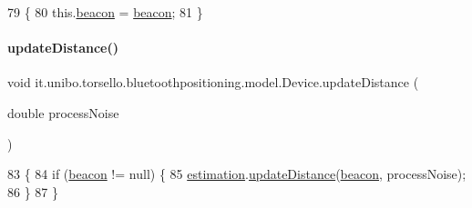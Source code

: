 \begin{DoxyCode}
79                                          \{
80         this.\hyperlink{classit_1_1unibo_1_1torsello_1_1bluetoothpositioning_1_1model_1_1Device_ad5ffce680eb2eb38fc6bb8aee234f155_ad5ffce680eb2eb38fc6bb8aee234f155}{beacon} = \hyperlink{classit_1_1unibo_1_1torsello_1_1bluetoothpositioning_1_1model_1_1Device_ad5ffce680eb2eb38fc6bb8aee234f155_ad5ffce680eb2eb38fc6bb8aee234f155}{beacon};
81     \}
\end{DoxyCode}
\hypertarget{classit_1_1unibo_1_1torsello_1_1bluetoothpositioning_1_1model_1_1Device_af6e2efc8c50b88d07cc651db1f4bbb34_af6e2efc8c50b88d07cc651db1f4bbb34}{}\label{classit_1_1unibo_1_1torsello_1_1bluetoothpositioning_1_1model_1_1Device_af6e2efc8c50b88d07cc651db1f4bbb34_af6e2efc8c50b88d07cc651db1f4bbb34} 
\paragraph{\texorpdfstring{update\+Distance()}{updateDistance()}}
{\footnotesize\ttfamily void it.\+unibo.\+torsello.\+bluetoothpositioning.\+model.\+Device.\+update\+Distance (\begin{DoxyParamCaption}\item[{double}]{process\+Noise }\end{DoxyParamCaption})}


\begin{DoxyCode}
83                                                     \{
84         \textcolor{keywordflow}{if} (\hyperlink{classit_1_1unibo_1_1torsello_1_1bluetoothpositioning_1_1model_1_1Device_ad5ffce680eb2eb38fc6bb8aee234f155_ad5ffce680eb2eb38fc6bb8aee234f155}{beacon} != null) \{
85             \hyperlink{classit_1_1unibo_1_1torsello_1_1bluetoothpositioning_1_1model_1_1Device_ac619c42728cd40f41a5f12fde56b4425_ac619c42728cd40f41a5f12fde56b4425}{estimation}.\hyperlink{classit_1_1unibo_1_1torsello_1_1bluetoothpositioning_1_1distanceEstimation_1_1Estimation_aaf86439861db7facf3f5338ec2fc6cde_aaf86439861db7facf3f5338ec2fc6cde}{updateDistance}(\hyperlink{classit_1_1unibo_1_1torsello_1_1bluetoothpositioning_1_1model_1_1Device_ad5ffce680eb2eb38fc6bb8aee234f155_ad5ffce680eb2eb38fc6bb8aee234f155}{beacon}, processNoise);
86         \}
87     \}
\end{DoxyCode}


